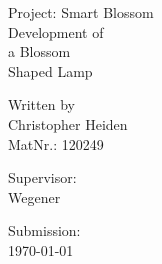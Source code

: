 \documentclass[doc.tex]{subfiles}
\begin{document}
    \begin{titlepage}
        \noindent
        Project: Smart Blossom
        \vspace{2em}
        \\
        {\fontsize{40}{50}\selectfont
        Development of \\[0.5em]
        a Blossom \\[0.5em]
        Shaped Lamp \\[0.5em]
        }
        \vspace*{\fill}
        \small 

        \hspace*{\fill} Written by \\
        \hspace*{\fill} Christopher Heiden \\
        \hspace*{\fill} MatNr.: 120249 \\
        \vspace{2em}

        \hspace*{\fill} Supervisor:  \\
        \hspace*{\fill} Wegener \\
        \vspace{2em}

        \hspace*{\fill} Submission: \\
        \hspace*{\fill} \bkdate\today 
    \end{titlepage}
    \newpage

    \tableofcontents
    \newpage
\end{document}
